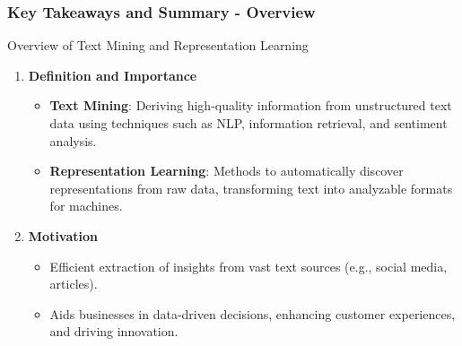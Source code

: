 \documentclass[aspectratio=169]{beamer}
\begin{document}
\begin{frame}[fragile]
    \frametitle{Key Takeaways and Summary - Overview}
    
    \begin{block}{Overview of Text Mining and Representation Learning}
        \begin{enumerate}
            \item \textbf{Definition and Importance}
                \begin{itemize}
                    \item \textbf{Text Mining}: Deriving high-quality information from unstructured text data using techniques such as NLP, information retrieval, and sentiment analysis.
                    \item \textbf{Representation Learning}: Methods to automatically discover representations from raw data, transforming text into analyzable formats for machines.
                \end{itemize}
            \item \textbf{Motivation}
                \begin{itemize}
                    \item Efficient extraction of insights from vast text sources (e.g., social media, articles).
                    \item Aids businesses in data-driven decisions, enhancing customer experiences, and driving innovation.
                \end{itemize}
        \end{enumerate}
    \end{block}

\end{frame}
\end{document}
